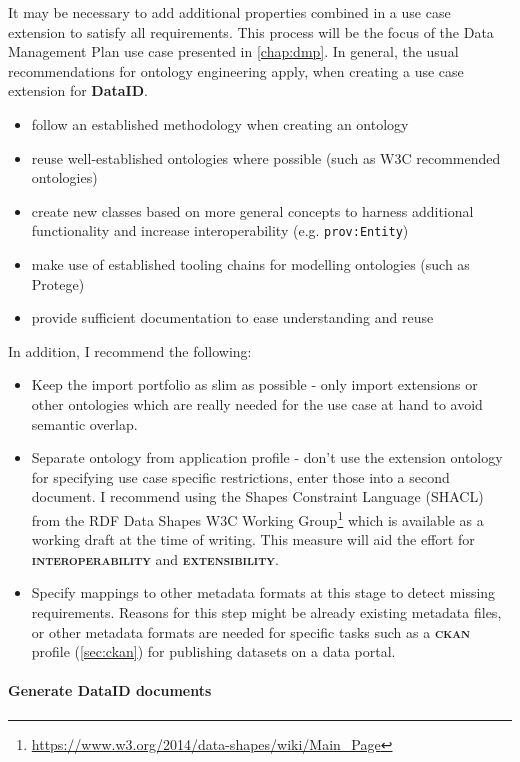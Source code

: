 \documentclass[a4paper,english,twoside,BCOR1.5cm,headsepline,DIV12,appendixprefix,final,12pt]{scrbook}
\newcommand{\extensibility}{{\ttfamily\scshape\bfseries extensibility}\xspace}
\newcommand{\interoperability}{{\ttfamily\scshape\bfseries interoperability}\xspace}
\newcommand{\dataid}{{\ttfamily\bfseries DataID}\xspace}
\newcommand{\ckan}{{\scshape\bfseries ckan}\xspace}
\newcommand{\prop}[1]{{{\texttt{#1}}}}
\newcommand\footnoteurl[1]{\footnote{\scriptsize\url{#1}}}
\begin{document}
It may be necessary to add additional properties combined in a use case extension to satisfy all requirements.
This process will be the focus of the Data Management Plan use case presented in \cref{chap:dmp}. In general, the usual recommendations for ontology engineering apply, when creating a use case extension for \dataid.

\begin{itemize}
\item follow an established methodology when creating an ontology
\item reuse well-established ontologies where possible (such as W3C recommended ontologies)
\item create new classes based on more general concepts to harness additional functionality and increase interoperability (e.g. \prop{prov:Entity})
\item make use of established tooling chains for modelling ontologies (such as Protege)
\item provide sufficient documentation to ease understanding and reuse
\end{itemize}

In addition, I recommend the following:

\begin{itemize}
\item Keep the import portfolio as slim as possible - only import extensions or other ontologies which are really needed for the use case at hand to avoid semantic overlap.
\item Separate ontology from application profile - don't use the extension ontology for specifying use case specific restrictions, enter those into a second document. I recommend using the Shapes Constraint Language (SHACL) \cite{shacl} from the RDF Data Shapes W3C Working Group\footnoteurl{https://www.w3.org/2014/data-shapes/wiki/Main_Page} which is available as a working draft at the time of writing. This measure will aid the effort for \interoperability and \extensibility.
\item Specify mappings to other metadata formats at this stage to detect missing requirements. Reasons for this step might be already existing metadata files, or other metadata formats are needed for specific tasks such as a \ckan profile (\cref{sec:ckan}) for publishing datasets on a data portal.
\end{itemize}

\paragraph{Generate DataID documents}
\label{sec:wfgenerate}
\end{document}
